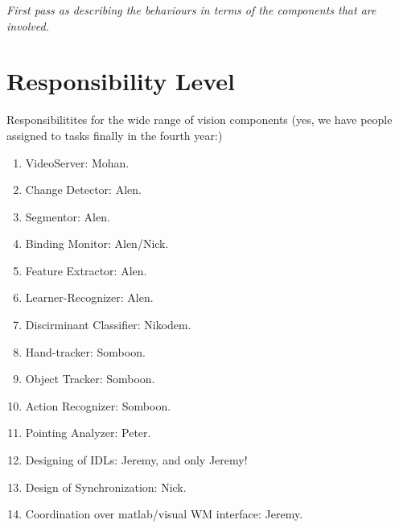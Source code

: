 \documentclass{article}
\begin{document}
\textit{
  First pass as describing the behaviours in terms of the components
  that are involved.}


\section{Responsibility Level}

Responsibilitites for the wide range of vision components (yes, we
have people assigned to tasks finally in the fourth year:)
\begin{enumerate}
\item VideoServer: Mohan.
\item Change Detector: Alen.
\item Segmentor: Alen.
\item Binding Monitor: Alen/Nick.
\item Feature Extractor: Alen.
\item Learner-Recognizer: Alen.
\item Discirminant Classifier: Nikodem.
\item Hand-tracker: Somboon.
\item Object Tracker: Somboon.
\item Action Recognizer: Somboon.
\item Pointing Analyzer: Peter.
\item Designing of IDLs: Jeremy, and only Jeremy!
\item Design of Synchronization: Nick.
\item Coordination over matlab/visual WM interface: Jeremy.
\end{enumerate}
\end{document}
